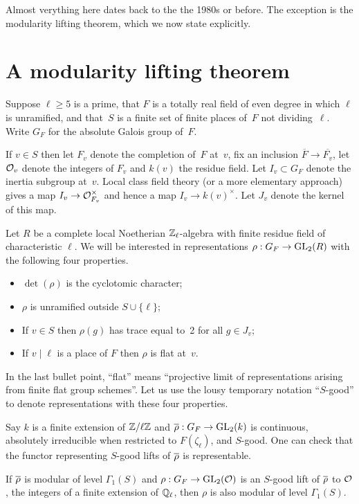 Almost verything here dates back to the the 1980s or before.
The exception is the modularity lifting theorem, which we now state explicitly.

\section{A modularity lifting theorem}

Suppose $\ell\geq5$ is a prime, that $F$ is a totally real field of even degree in which $\ell$
is unramified, and that~$S$ is a finite set of finite places of~$F$ not dividing~$\ell$. Write
$G_F$ for the absolute Galois group of~$F$.

If $v\in S$ then let $F_v$ denote the completion of~$F$ at~$v$, fix an inclusion $\overline{F}\to\overline{F_v}$,
let $\mathcal{O}_v$ denote the integers of $F_v$ and $k(v)$ the residue field. Let $I_v\subset G_F$ denote the inertia 
subgroup at~$v$. Local class field theory (or a more elementary approach) gives a map $I_v\to\mathcal{O}_{F_v}^\times$
and hence a map $I_v\to k(v)^\times$. Let $J_v$ denote the kernel of this map.

Let $R$ be a complete local Noetherian $\mathbb{Z}_\ell$-algebra with finite residue field of characteristic $\ell$.
We will be interested in representations $\rho:G_F\to\operatorname{GL}_2(R)$ with the following four properties.
\begin{itemize}
    \item $\det(\rho)$ is the cyclotomic character;
    \item $\rho$ is unramified outside $S\cup\{\ell\}$;
    \item If $v\in S$ then $\rho(g)$ has trace equal to~2 for all $g\in J_v$;
    \item If $v\mid\ell$ is a place of $F$ then $\rho$ is flat at~$v$.
\end{itemize}

In the last bullet point, ``flat'' means ``projective limit of representations arising from
finite flat group schemes''. Let us use the lousy temporary notation ``$S$-good'' to denote
representations with these four properties.

Say $k$ is a finite extension of $\mathbb{Z}/\ell\mathbb{Z}$ and $\overline{\rho}:G_F\to\operatorname{GL}_2(k)$ is continuous,
absolutely irreducible when restricted to $F(\zeta_\ell)$, and $S$-good. One can check
that the functor representing $S$-good lifts of $\overline{\rho}$ is representable.

\begin{theorem}\label{modularity_lifting_theorem}\notready
        If $\overline{\rho}$ is modular of level $\Gamma_1(S)$ and $\rho:G_F\to\operatorname{GL}_2(\mathcal{O})$ is
        an $S$-good lift of $\overline{\rho}$ to $\mathcal{O}$, the integers of a finite extension of $\mathbb{Q}_\ell$,
        then $\rho$ is also modular of level $\Gamma_1(S)$.
\end{theorem}

